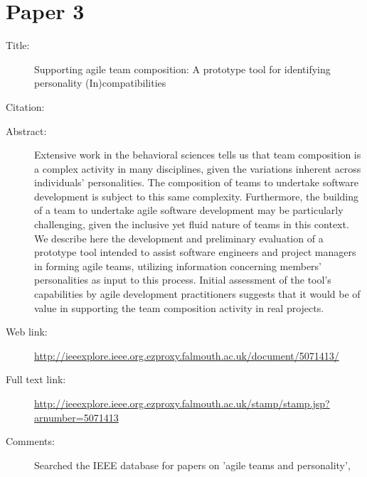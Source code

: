 \documentclass{scrartcl}
\begin{document}
\section*{Paper 3}
\begin{description}
\item[Title:] Supporting agile team composition: A prototype tool for identifying personality (In)compatibilities
\item[Citation:] \cite{Paper3}
\item[Abstract:] {Extensive work in the behavioral sciences tells us that team composition is a complex activity in many disciplines, 
given the variations inherent across individuals' personalities. The composition of teams to undertake software development is subject 
to this same complexity. Furthermore, the building of a team to undertake agile software development may be particularly challenging, 
given the inclusive yet fluid nature of teams in this context. We describe here the development and preliminary evaluation of a 
prototype tool intended to assist software engineers and project managers in forming agile teams, utilizing information concerning 
members' personalities as input to this process. Initial assessment of the tool's capabilities by agile development practitioners 
suggests that it would be of value in supporting the team composition activity in real projects.}
\item[Web link:] \url{http://ieeexplore.ieee.org.ezproxy.falmouth.ac.uk/document/5071413/}
\item[Full text link:] \url{http://ieeexplore.ieee.org.ezproxy.falmouth.ac.uk/stamp/stamp.jsp?arnumber=5071413}
\item[Comments:] Searched the IEEE database for papers on 'agile teams and personality',
\end{description}
\end{document}
